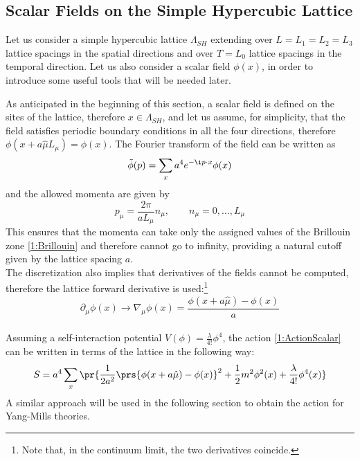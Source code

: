 \subsection{Scalar Fields on the Simple Hypercubic Lattice}
Let us consider a simple hypercubic lattice $\Lambda_{SH}$ extending over $L=L_1=L_2=L_3$ lattice spacings in the spatial directions and over $T=L_0$ lattice spacings in the temporal direction.
Let us also consider a scalar field $\phi(x)$, in order to introduce some useful tools that will be needed later.

As anticipated in the beginning of this section, a scalar field is defined on the sites of the lattice, therefore $x\in\Lambda_{SH}$, and let us assume, for simplicity, that the field satisfies periodic boundary conditions in all the four directions, therefore $\phi(x+a\hat\mu L_\mu)=\phi(x)$.
The Fourier transform of the field can be written as
\begin{equation}
    \tilde\phi(p)=\sum_x a^4 e^{-\i p\cdot x}\phi(x) \label{1:FourierScalar}
\end{equation}
and the allowed momenta are given by
\begin{equation}
    p_\mu=\frac{2\pi}{aL_\mu}n_\mu, \qquad n_\mu=0, \dots, L_\mu \label{1:Brillouin}
\end{equation}
This ensures that the momenta can take only the assigned values of the Brillouin zone \eqref{1:Brillouin} and therefore cannot go to infinity, providing a natural cutoff given by the lattice spacing $a$.\\
The discretization also implies that derivatives of the fields cannot be computed, therefore the lattice forward derivative is used:\footnote{Note that, in the continuum limit, the two derivatives coincide.}
\begin{equation}
    \partial_\mu\phi(x)\rightarrow \nabla_\mu\phi(x)=\frac{\phi(x+a\hat\mu)-\phi(x)}{a} \label{1:ForwardLatticeDerivative}
\end{equation}\\
Assuming a self-interaction potential $V(\phi)=\frac\lambda{4!}\phi^4$, the action \eqref{1:ActionScalar} can be written in terms of the lattice in the following way:
\begin{equation}
    S=a^4\sum_x\pr{\frac1{2a^2}\prs{\phi(x+a\hat\mu)-\phi(x)}^2+\frac12m^2\phi^2(x)+\frac\lambda{4!}\phi^4(x)} \label{1:ScalarActionLattice}
\end{equation}
A similar approach will be used in the following section to obtain the action for Yang-Mills theories.

